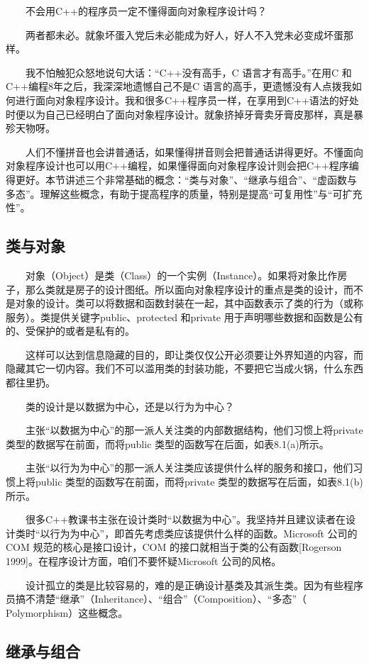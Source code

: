 \documentclass[11pt]{article}
\begin{document}
　　不会用C++的程序员一定不懂得面向对象程序设计吗？

　　两者都未必。就象坏蛋入党后未必能成为好人，好人不入党未必变成坏蛋那样。

　　我不怕触犯众怒地说句大话：“C++没有高手，C 语言才有高手。”在用C 和C++编程8年之后，我深深地遗憾自己不是C 语言的高手，更遗憾没有人点拨我如何进行面向对象程序设计。我和很多C++程序员一样，在享用到C++语法的好处时便以为自己已经明白了面向对象程序设计。就象挤掉牙膏卖牙膏皮那样，真是暴殄天物呀。

　　人们不懂拼音也会讲普通话，如果懂得拼音则会把普通话讲得更好。不懂面向对象程序设计也可以用C++编程，如果懂得面向对象程序设计则会把C++程序编得更好。本节讲述三个非常基础的概念：“类与对象”、“继承与组合”、“虚函数与多态”。理解这些概念，有助于提高程序的质量，特别是提高“可复用性”与“可扩充性”。

\subsection{类与对象}
\label{sec-1-1}

　　对象（Object）是类（Class）的一个实例（Instance）。如果将对象比作房子，那么类就是房子的设计图纸。所以面向对象程序设计的重点是类的设计，而不是对象的设计。类可以将数据和函数封装在一起，其中函数表示了类的行为（或称服务）。类提供关键字public、protected 和private 用于声明哪些数据和函数是公有的、受保护的或者是私有的。

　　这样可以达到信息隐藏的目的，即让类仅仅公开必须要让外界知道的内容，而隐藏其它一切内容。我们不可以滥用类的封装功能，不要把它当成火锅，什么东西都往里扔。

　　类的设计是以数据为中心，还是以行为为中心？

　　主张“以数据为中心”的那一派人关注类的内部数据结构，他们习惯上将private 类型的数据写在前面，而将public 类型的函数写在后面，如表8.1(a)所示。

　　主张“以行为为中心”的那一派人关注类应该提供什么样的服务和接口，他们习惯上将public 类型的函数写在前面，而将private 类型的数据写在后面，如表8.1(b)所示。

　　很多C++教课书主张在设计类时“以数据为中心”。我坚持并且建议读者在设计类时“以行为为中心”，即首先考虑类应该提供什么样的函数。Microsoft 公司的COM 规范的核心是接口设计，COM 的接口就相当于类的公有函数[Rogerson 1999]。在程序设计方面，咱们不要怀疑Microsoft 公司的风格。

　　设计孤立的类是比较容易的，难的是正确设计基类及其派生类。因为有些程序员搞不清楚“继承”（Inheritance）、“组合”（Composition）、“多态”（ Polymorphism）这些概念。
\subsection{继承与组合}
\label{sec-1-2}
\end{document}

